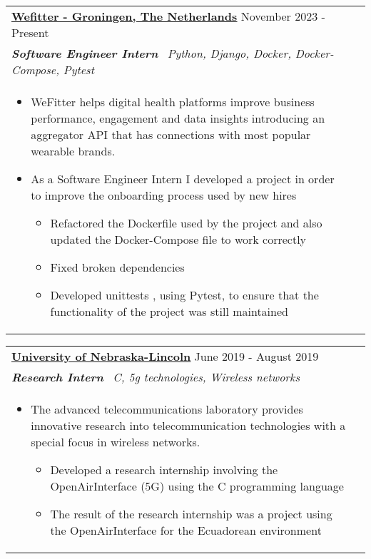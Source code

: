 \documentclass[a4paper,8pt]{article}
\begin{document}
\begin{tabularx}{\linewidth}{ @{}l r@{} }
\textbf{\uline{\href{https://www.wefitter.com/en-us/}{Wefitter - Groningen, The Netherlands}}} \hfill \color[HTML]{371e77} November 2023 - Present \\[4pt]
\color[HTML]{371e77}\textbf{\textit{Software Engineer Intern}}\ \hfill \color[HTML]{4B28A4} \textit{Python, Django, Docker, Docker-Compose, Pytest} \\[5pt]
\begin{minipage}[t]{\linewidth}
    \begin{itemize}[nosep,after=\strut, leftmargin=2em, itemsep=2pt]
        \item WeFitter helps digital health platforms improve business performance, engagement and data insights introducing an aggregator API that has connections with most popular wearable brands.
        \item As a Software Engineer Intern I developed a project in order to improve the onboarding process used by new hires
        \begin{itemize}
            \item Refactored the Dockerfile used by the project and also updated the Docker-Compose file to work correctly
            \item Fixed broken dependencies
            \item Developed unittests , using Pytest, to ensure that the functionality of the project was still maintained
        \end{itemize}
    \end{itemize}
\end{minipage}
\end{tabularx}

\begin{tabularx}{\linewidth}{ @{}l r@{} }
\textbf{\uline{\href{https://www.unl.edu/}{University of Nebraska-Lincoln}}} \hfill \color[HTML]{371e77} June 2019 - August 2019 \\[4pt]
\color[HTML]{371e77}\textbf{\textit{Research Intern}}\ \hfill \color[HTML]{4B28A4} \textit{C, 5g technologies, Wireless networks} \\[5pt]
\begin{minipage}[t]{\linewidth}
    \begin{itemize}[nosep,after=\strut, leftmargin=2em, itemsep=2pt]
        \item The advanced telecommunications laboratory provides innovative research into telecommunication technologies with a special focus in wireless networks.
        \begin{itemize}
            \item Developed a research internship involving the OpenAirInterface (5G) using the C programming language  
            \item The result of the research internship was a project using the OpenAirInterface for the Ecuadorean environment
        \end{itemize}
    \end{itemize}
\end{minipage}
\end{tabularx}
\end{document}
